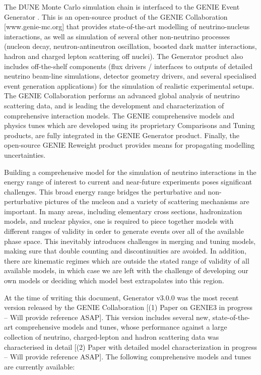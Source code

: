 The DUNE Monte Carlo simulation chain is interfaced to the GENIE Event Generator \cite{Andreopoulos:2009rq}. This is an open-source product of the GENIE Collaboration [www.genie-mc.org] that provides state-of-the-art modelling of neutrino-nucleus interactions, as well as simulation of several other non-neutrino processes (nucleon decay, neutron-antineutron oscillation, boosted dark matter interactions, hadron and charged lepton scattering off nuclei). The Generator product also includes off-the-shelf components (flux drivers / interfaces to outputs of detailed neutrino beam-line simulations, detector geometry drivers, and several specialised event generation applications) for the simulation of realistic experimental setups. The GENIE Collaboration performs an advanced global analysis of neutrino scattering data, and is leading the development and characterization of comprehensive interaction models. The GENIE comprehensive models and physics tunes which are developed using its proprietary Comparisons and Tuning products, are fully integrated in the GENIE Generator product. Finally, the open-source GENIE Reweight product provides means for propagating modelling uncertainties. 

Building a comprehensive model for the simulation of neutrino interactions in the energy range of interest to current and near-future experiments poses significant challenges. This broad energy range bridges the perturbative and non-perturbative pictures of the nucleon and a variety of scattering mechanisms are important. In many areas, including elementary cross sections, hadronization models, and nuclear physics, one is required to piece together models with different ranges of validity in order to generate events over all of the available phase space. This inevitably introduces challenges in merging and tuning models, making sure that double counting and discontinuities are avoided. In addition, there are kinematic regimes which are outside the stated range of validity of all available models, in which case we are left with the challenge of developing our own models or deciding which model best extrapolates into this region. 

At the time of writing this document, Generator v3.0.0 was the most recent version released by the GENIE Collaboration [(1) Paper on GENIE3 in progress -- Will provide reference ASAP]. This version includes several new, state-of-the-art comprehensive models and tunes, whose performance against a large collection of neutrino, charged-lepton and hadron scattering data was characterised in detail [(2) Paper with detailed model characterization in progress -- Will provide reference ASAP]. The following comprehensive models and tunes are currently available:

